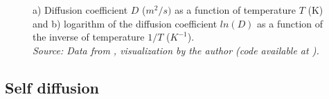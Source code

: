 \begin{figure}[h]
 \centering
 \captionsetup{justification=centering,margin=2cm}
 \caption{a) Diffusion coefficient $D$ ($m^2/s)$ as a function of temperature $T$ (K) and b) logarithm of the diffusion coefficient $ln(D)$ as a function of the inverse of temperature $1/T$ ($K^{-1}$). \\
 \textit{Source: Data from \citep{kakusan}, visualization by the author (code available at \citep{mygit}).}}
 \label{fig:diffusion}
\end{figure}


\newpage
\subsection{Self diffusion}

